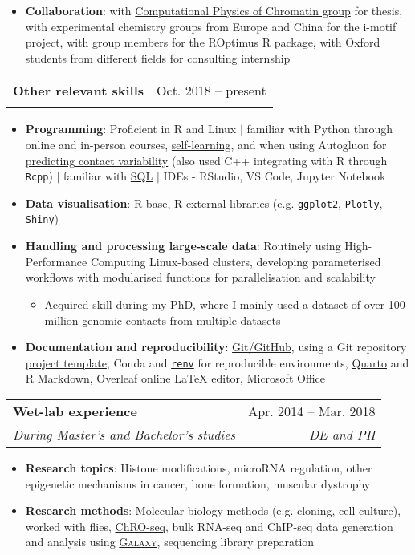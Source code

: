 \documentclass[a4paper,11pt]{article}
\makeatletter
\newcommand{\resumeItem}[2]{
  \item\small{
    \textbf{#1}{: #2 \vspace{-2pt}}
  }
}
\newcommand{\resumeSubheading}[4]{
  \vspace{-1pt}\item
    \begin{tabular*}{0.97\textwidth}[t]{l@{\extracolsep{\fill}}r}
      \textbf{#1} & #2 \\
      \textit{\small#3} & \textit{\small #4} \\
    \end{tabular*}\vspace{-5pt}
}
\newcommand{\resumeItemListStart}{\begin{itemize}}
\newcommand{\resumeItemListEnd}{\end{itemize}\vspace{-5pt}}
\makeatother
\begin{document}
            \resumeItemListStart
                \resumeItem{Collaboration}{with \href{http://www.collepardolab.org/}{Computational Physics of Chromatin group} for thesis, with experimental chemistry groups from Europe and China for the i-motif project, with group members for the ROptimus R package, with Oxford students from different fields for consulting internship}
            \resumeItemListEnd

        \resumeSubheading
        {Other relevant skills}{Oct. 2018 -- present}{}{}
            \resumeItemListStart
                \resumeItem{Programming}{Proficient in R and Linux $|$ familiar with Python through online and in-person courses, \href{https://github.com/liezeltamon/advent-of-code}{self-learning}, and when using Autogluon for \href{https://github.com/liezeltamon/predicting-contact-variability/tree/main}{predicting contact variability} (also used C++ integrating with R through \texttt{Rcpp}) $|$ familiar with \href{https://learn.365datascience.com/certificates/CC-1C72E62035/}{SQL} $|$ IDEs - RStudio, VS Code, Jupyter Notebook}
            \resumeItemListEnd

            \resumeItemListStart
                \resumeItem{Data visualisation}{R base, R external libraries (e.g. \texttt{ggplot2}, \texttt{Plotly}, \texttt{Shiny})}
            \resumeItemListEnd
            
            \resumeItemListStart
                \resumeItem{Handling and processing large-scale data}{Routinely using High-Performance Computing Linux-based clusters, developing parameterised workflows with modularised functions for parallelisation and scalability}
                    \begin{itemize}
                        \item {Acquired skill during my PhD, where I mainly used a dataset of over 100 million genomic contacts from multiple datasets}
                    \end{itemize}
                \resumeItem{Documentation and reproducibility}{{\href{https://github.com/liezeltamon}{Git/GitHub}}, using a Git repository \href{https://github.com/liezeltamon/project-template}{project template}, Conda and \href{https://rstudio.github.io/renv/articles/renv.html}{\texttt{renv}} for reproducible environments, \href{https://quarto.org}{Quarto} and R Markdown, Overleaf online LaTeX editor, Microsoft Office}
                
            \resumeItemListEnd

        \resumeSubheading
        {Wet-lab experience}{Apr. 2014 -- Mar. 2018}{During Master's and Bachelor's studies}{DE and PH}
            \resumeItemListStart
                \resumeItem{Research topics}{Histone modifications, microRNA regulation, other epigenetic mechanisms in cancer, bone formation, muscular dystrophy}
                \resumeItem{Research methods}{Molecular biology methods (e.g. cloning, cell culture), worked with flies, \href{https://www.nature.com/articles/s41588-018-0244-3#data-availability}{ChRO-seq}, bulk RNA-seq and ChIP-seq data generation and analysis using \href{https://usegalaxy.org/}{\textsc{Galaxy}}, sequencing library preparation}
            \resumeItemListEnd
        
\end{document}
